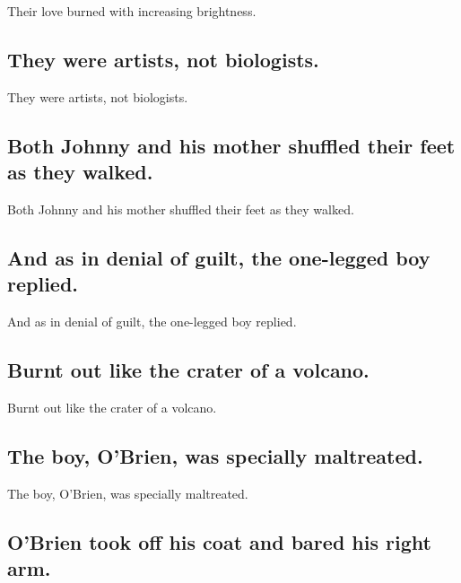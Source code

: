\documentclass[]{article}
\begin{document}
Their love burned with increasing brightness.

\hypertarget{they-were-artists-not-biologists.}{%
\subsection{They were artists, not
biologists.}\label{they-were-artists-not-biologists.}}

They were artists, not biologists.

\hypertarget{both-johnny-and-his-mother-shuffled-their-feet-as-they-walked.}{%
\subsection{Both Johnny and his mother shuffled their feet as they
walked.}\label{both-johnny-and-his-mother-shuffled-their-feet-as-they-walked.}}

Both Johnny and his mother shuffled their feet as they walked.

\hypertarget{and-as-in-denial-of-guilt-the-one-legged-boy-replied.}{%
\subsection{And as in denial of guilt, the one-legged boy
replied.}\label{and-as-in-denial-of-guilt-the-one-legged-boy-replied.}}

And as in denial of guilt, the one-legged boy replied.

\hypertarget{burnt-out-like-the-crater-of-a-volcano.}{%
\subsection{Burnt out like the crater of a
volcano.}\label{burnt-out-like-the-crater-of-a-volcano.}}

Burnt out like the crater of a volcano.

\hypertarget{the-boy-obrien-was-specially-maltreated.}{%
\subsection{The boy, O'Brien, was specially
maltreated.}\label{the-boy-obrien-was-specially-maltreated.}}

The boy, O'Brien, was specially maltreated.

\hypertarget{obrien-took-off-his-coat-and-bared-his-right-arm.}{%
\subsection{O'Brien took off his coat and bared his right
arm.}\label{obrien-took-off-his-coat-and-bared-his-right-arm.}}
\end{document}
